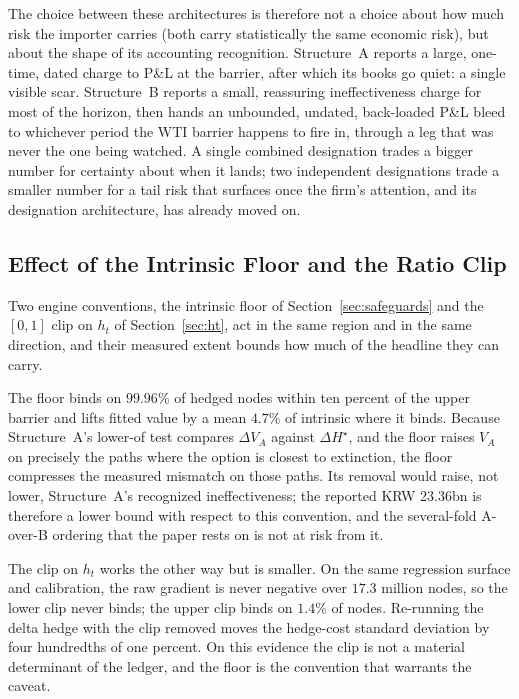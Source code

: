 \documentclass[11pt,a4paper]{article}
\begin{document}
The choice between these architectures is therefore not a choice about how much risk the importer carries (both carry statistically the same economic risk), but about the shape of its accounting recognition. Structure~A reports a large, one-time, dated charge to P\&L at the barrier, after which its books go quiet: a single visible scar. Structure~B reports a small, reassuring ineffectiveness charge for most of the horizon, then hands an unbounded, undated, back-loaded P\&L bleed to whichever period the WTI barrier happens to fire in, through a leg that was never the one being watched. A single combined designation trades a bigger number for certainty about when it lands; two independent designations trade a smaller number for a tail risk that surfaces once the firm's attention, and its designation architecture, has already moved on.

\subsection{Effect of the Intrinsic Floor and the Ratio Clip}
\label{sec:awareness2}

Two engine conventions, the intrinsic floor of Section~\ref{sec:safeguards} and the $[0,1]$ clip on $h_t$ of Section~\ref{sec:ht}, act in the same region and in the same direction, and their measured extent bounds how much of the headline they can carry.

The floor binds on $99.96\%$ of hedged nodes within ten percent of the upper barrier and lifts fitted value by a mean $4.7\%$ of intrinsic where it binds. Because Structure~A's lower-of test compares $\Delta V_A$ against $\Delta H^\star$, and the floor raises $V_A$ on precisely the paths where the option is closest to extinction, the floor compresses the measured mismatch on those paths. Its removal would raise, not lower, Structure~A's recognized ineffectiveness; the reported KRW 23.36bn is therefore a lower bound with respect to this convention, and the several-fold A-over-B ordering that the paper rests on is not at risk from it.

The clip on $h_t$ works the other way but is smaller. On the same regression surface and calibration, the raw gradient is never negative over $17.3$ million nodes, so the lower clip never binds; the upper clip binds on $1.4\%$ of nodes. Re-running the delta hedge with the clip removed moves the hedge-cost standard deviation by four hundredths of one percent. On this evidence the clip is not a material determinant of the ledger, and the floor is the convention that warrants the caveat.
\end{document}
